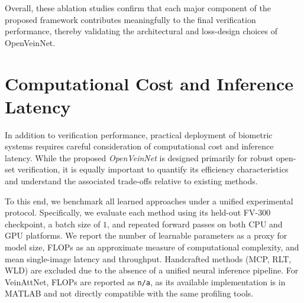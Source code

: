 \documentclass[10pt,journal,compsoc]{IEEEtran}
\begin{document}
Overall, these ablation studies confirm that each major component of the proposed framework contributes meaningfully to the final verification performance, thereby validating the architectural and loss-design choices of OpenVeinNet.

\section{Computational Cost and Inference Latency}
\label{sec:efficiency}

In addition to verification performance, practical deployment of biometric systems requires careful consideration of computational cost and inference latency. While the proposed \textit{OpenVeinNet} is designed primarily for robust open-set verification, it is equally important to quantify its efficiency characteristics and understand the associated trade-offs relative to existing methods.

To this end, we benchmark all learned approaches under a unified experimental protocol. Specifically, we evaluate each method using its held-out FV-300 checkpoint, a batch size of $1$, and repeated forward passes on both CPU and GPU platforms. We report the number of learnable parameters as a proxy for model size, FLOPs as an approximate measure of computational complexity, and mean single-image latency and throughput. Handcrafted methods (MCP, RLT, WLD) are excluded due to the absence of a unified neural inference pipeline. For VeinAttNet, FLOPs are reported as \texttt{n/a}, as its available implementation is in MATLAB and not directly compatible with the same profiling tools.

\begin{table}[ht!]
    \centering
    \scriptsize
    \caption{Runtime and computational-cost comparison on FV-300 using batch size $1$. Lower latency is better; higher throughput is better.}
    \label{tab:rebuttal_runtime}
\end{table}
\end{document}
